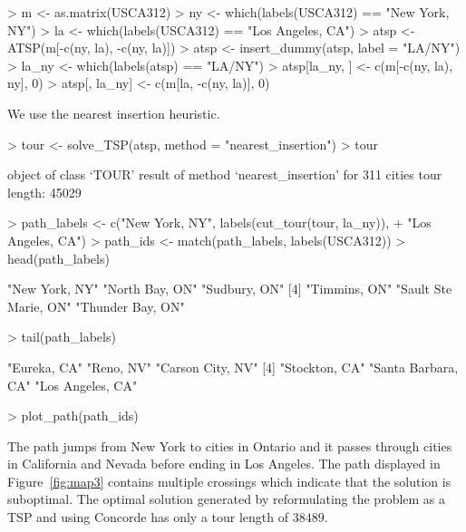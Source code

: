 \documentclass[10pt,a4paper,fleqn]{article}
\begin{document}
\begin{Schunk}
\begin{Sinput}
> m <- as.matrix(USCA312)
> ny <- which(labels(USCA312) == "New York, NY")
> la <- which(labels(USCA312) == "Los Angeles, CA")
> atsp <- ATSP(m[-c(ny, la), -c(ny, la)])
> atsp <- insert_dummy(atsp, label = "LA/NY")
> la_ny <- which(labels(atsp) == "LA/NY")
> atsp[la_ny, ] <- c(m[-c(ny, la), ny], 0)
> atsp[, la_ny] <- c(m[la, -c(ny, la)], 0)
\end{Sinput}
\end{Schunk}


We use the nearest insertion heuristic.
\begin{Schunk}
\begin{Sinput}
> tour <- solve_TSP(atsp, method = "nearest_insertion")
> tour
\end{Sinput}
\begin{Soutput}
object of class ‘TOUR’ 
result of method ‘nearest_insertion’ for 311 cities
tour length: 45029 
\end{Soutput}
\begin{Sinput}
> path_labels <- c("New York, NY", labels(cut_tour(tour, la_ny)), 
+     "Los Angeles, CA")
> path_ids <- match(path_labels, labels(USCA312))
> head(path_labels)
\end{Sinput}
\begin{Soutput}
[1] "New York, NY"        "North Bay, ON"       "Sudbury, ON"        
[4] "Timmins, ON"         "Sault Ste Marie, ON" "Thunder Bay, ON"    
\end{Soutput}
\begin{Sinput}
> tail(path_labels)
\end{Sinput}
\begin{Soutput}
[1] "Eureka, CA"        "Reno, NV"          "Carson City, NV"  
[4] "Stockton, CA"      "Santa Barbara, CA" "Los Angeles, CA"  
\end{Soutput}
\end{Schunk}
\begin{Schunk}
\begin{Sinput}
> plot_path(path_ids)
\end{Sinput}
\end{Schunk}


The path jumps from New York to cities in Ontario and it passes through
cities in California and Nevada before ending in Los Angeles. The path
displayed in Figure~\ref{fig:map3} contains multiple crossings which
indicate that the solution is suboptimal. The optimal solution generated
by reformulating the problem as a TSP and using Concorde has only a tour
length of $38489$.
\end{document}
